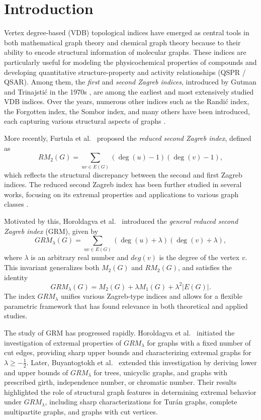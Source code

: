 \documentclass[preprint,12pt]{elsarticle}
\begin{document}

\section{Introduction}

Vertex degree-based (VDB) topological indices have emerged as central tools in both mathematical graph theory and chemical graph theory because to their ability to encode structural information of molecular graphs. These indices are particularly useful for modeling the physicochemical properties of compounds and developing quantitative structure-property and activity relationships (QSPR / QSAR). Among them, the \emph{first} and \emph{second Zagreb indices}, introduced by Gutman and Trinajstić in the 1970s \cite{gutman1972,gutman1975}, are among the earliest and most extensively studied VDB indices. Over the years, numerous other indices such as the Randić index, the Forgotten index, the Sombor index, and many others have been introduced, each capturing various structural aspects of graphs \cite{gutman2013,furtula2018,nikolic2003}.

More recently, Furtula et al.~\cite{furtula2014} proposed the \emph{reduced second Zagreb index}, defined as
\[
RM_2(G) = \sum_{uv \in E(G)} (\deg(u) - 1)(\deg(v) - 1),
\]
which reflects the structural discrepancy between the second and first Zagreb indices.
The reduced second Zagreb index has been further studied in several works, focusing on its extremal properties and applications to various graph classes \cite{buyantogtokh2020,gao2020,shafique2017}.


Motivated by this, Horoldagva et al.~\cite{horoldagva2019} introduced the \emph{general reduced second Zagreb index} (GRM), given by
\[
GRM_\lambda(G) = \sum_{uv \in E(G)} (\deg(u) + \lambda)(\deg(v) + \lambda),
\]
where $\lambda$ is an arbitrary real number and $deg (v)$ is the degree of the vertex $v$.
This invariant generalizes both $M_2(G)$ and $RM_2(G)$, and satisfies the identity
\[
GRM_\lambda(G) = M_2(G) + \lambda M_1(G) + \lambda^2 |E(G)|.
\]
The index $GRM_\lambda$ unifies various Zagreb-type indices and allows for a flexible parametric framework that has found relevance in both theoretical and applied studies.

The study of GRM has progressed rapidly. Horoldagva et al.~\cite{horoldagva2019} initiated the investigation of extremal properties of $GRM_\lambda$ for graphs with a fixed number of cut edges, providing sharp upper bounds and characterizing extremal graphs for $\lambda \geq -\frac{1}{2}$. Later, Buyantogtokh et al.~\cite{das2022} extended this investigation by deriving lower and upper bounds of $GRM_\lambda$ for trees, unicyclic graphs, and graphs with prescribed girth, independence number, or chromatic number. Their results highlighted the role of structural graph features in determining extremal behavior under $GRM_{\lambda}$, including sharp characterizations for Turán graphs, complete multipartite graphs, and graphs with cut vertices. 
\end{document}
